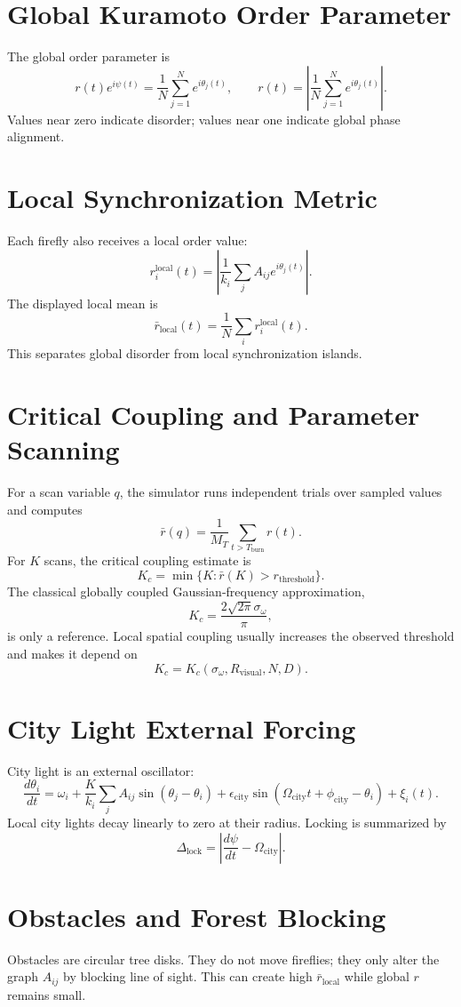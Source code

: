 \documentclass[11pt]{article}
\begin{document}
\section{Global Kuramoto Order Parameter}
The global order parameter is
\[
r(t)e^{i\psi(t)}=\frac{1}{N}\sum_{j=1}^N e^{i\theta_j(t)},
\qquad
r(t)=\left|\frac{1}{N}\sum_{j=1}^N e^{i\theta_j(t)}\right|.
\]
Values near zero indicate disorder; values near one indicate global phase alignment.

\section{Local Synchronization Metric}
Each firefly also receives a local order value:
\[
r_i^{\mathrm{local}}(t)=
\left|\frac{1}{k_i}\sum_j A_{ij}e^{i\theta_j(t)}\right|.
\]
The displayed local mean is
\[
\bar r_{\mathrm{local}}(t)=\frac{1}{N}\sum_i r_i^{\mathrm{local}}(t).
\]
This separates global disorder from local synchronization islands.

\section{Critical Coupling and Parameter Scanning}
For a scan variable $q$, the simulator runs independent trials over sampled values and computes
\[
\bar r(q)=\frac{1}{M_T}\sum_{t>T_{\mathrm{burn}}} r(t).
\]
For $K$ scans, the critical coupling estimate is
\[
K_c=\min\{K:\bar r(K)>r_{\mathrm{threshold}}\}.
\]
The classical globally coupled Gaussian-frequency approximation,
\[
K_c=\frac{2\sqrt{2\pi}\sigma_\omega}{\pi},
\]
is only a reference. Local spatial coupling usually increases the observed threshold and makes it depend on
\[
K_c=K_c(\sigma_\omega,R_{\mathrm{visual}},N,D).
\]

\section{City Light External Forcing}
City light is an external oscillator:
\[
\frac{d\theta_i}{dt}=
\omega_i+
\frac{K}{k_i}\sum_j A_{ij}\sin(\theta_j-\theta_i)
+\epsilon_{\mathrm{city}}\sin(\Omega_{\mathrm{city}}t+\phi_{\mathrm{city}}-\theta_i)
+\xi_i(t).
\]
Local city lights decay linearly to zero at their radius. Locking is summarized by
\[
\Delta_{\mathrm{lock}}=\left|\frac{d\psi}{dt}-\Omega_{\mathrm{city}}\right|.
\]

\section{Obstacles and Forest Blocking}
Obstacles are circular tree disks. They do not move fireflies; they only alter the graph $A_{ij}$ by blocking line of sight. This can create high $\bar r_{\mathrm{local}}$ while global $r$ remains small.
\end{document}

